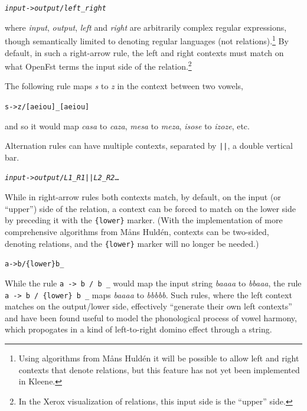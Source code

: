 \documentclass[letterpaper,12pt]{article}
\begin{document}
\begin{alltt}
\emph{input} -> \emph{output} / \emph{left} _ \emph{right}
\end{alltt}

\noindent
where \emph{input}, \emph{output}, \emph{left} and \emph{right} are
arbitrarily complex regular expressions, though semantically limited to
denoting regular languages (not relations).\footnote{Using algorithms
from M\r{a}ns Huld\'en it will be possible to allow left and right
contexts that denote relations, but this feature has not yet been
implemented in Kleene.}  By default, in such a right-arrow rule, the left
and right contexts must match on what OpenFst terms the input side of the
relation.\footnote{In the Xerox visualization of relations, this input
side is the ``upper'' side.}  

The following rule maps \emph{s} to \emph{z} in the context between two vowels,

\begin{alltt}
s -> z / [aeiou] _ [aeiou]
\end{alltt}

\noindent
and so it would map \emph{casa} to \emph{caza}, \emph{mesa} to \emph{meza},
\emph{isose} to \emph{izoze}, etc.

Alternation rules can have multiple contexts, separated by \texttt{||}, a double
vertical bar.

\begin{alltt}
\emph{input} -> \emph{output} / \emph{L1} _ \emph{R1} || \emph{L2} _ \emph{R2} \ldots
\end{alltt}

While in right-arrow rules both contexts match, by default, on the input
(or ``upper'') side of the relation, a context can be forced to match on
the lower side by preceding it with the \texttt{\{lower\}} marker. (With
the implementation of more comprehensive algorithms from M\r{a}ns
Huld\'en, contexts can be two-sided, denoting relations, and the
\texttt{\{lower\}} marker will no longer be needed.)

\begin{alltt}
a -> b / \{lower\} b _
\end{alltt}

\noindent
While the rule \texttt{a -> b / b \_} would map the input string
\emph{baaaa} to \emph{bbaaa}, the rule \texttt{a -> b / \{lower\} b \_}
maps \emph{baaaa} to \emph{bbbbb}.  Such rules, where the left context
matches on the output/lower side, effectively ``generate their own left
contexts'' and have been found useful to model the phonological process
of vowel harmony, which propogates in a kind of left-to-right domino
effect through a string.
\end{document}
